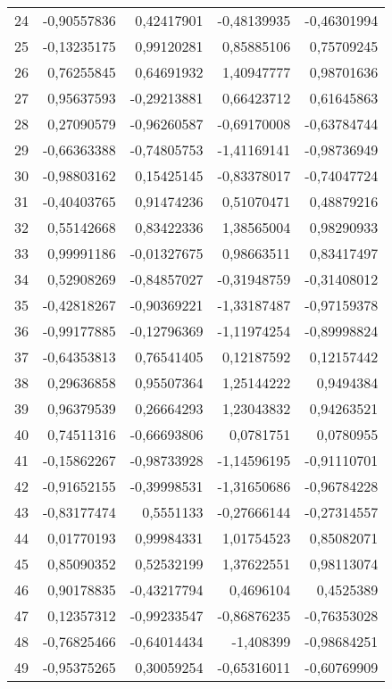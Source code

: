 \documentclass[12pt]{article}
\begin{document}
\begin{longtable}{lrrrr}
 24 & -0,90557836 & 0,42417901 & -0,48139935 & -0,46301994 \\
 25 & -0,13235175 & 0,99120281 & 0,85885106 & 0,75709245 \\
 26 & 0,76255845 & 0,64691932 & 1,40947777 & 0,98701636 \\
 27 & 0,95637593 & -0,29213881 & 0,66423712 & 0,61645863 \\
 28 & 0,27090579 & -0,96260587 & -0,69170008 & -0,63784744 \\
 29 & -0,66363388 & -0,74805753 & -1,41169141 & -0,98736949 \\
 30 & -0,98803162 & 0,15425145 & -0,83378017 & -0,74047724 \\
 31 & -0,40403765 & 0,91474236 & 0,51070471 & 0,48879216 \\
 32 & 0,55142668 & 0,83422336 & 1,38565004 & 0,98290933 \\
 33 & 0,99991186 & -0,01327675 & 0,98663511 & 0,83417497 \\
 34 & 0,52908269 & -0,84857027 & -0,31948759 & -0,31408012 \\
 35 & -0,42818267 & -0,90369221 & -1,33187487 & -0,97159378 \\
 36 & -0,99177885 & -0,12796369 & -1,11974254 & -0,89998824 \\
 37 & -0,64353813 & 0,76541405 & 0,12187592 & 0,12157442 \\
 38 & 0,29636858 & 0,95507364 & 1,25144222 &  0,9494384 \\
 39 & 0,96379539 & 0,26664293 & 1,23043832 & 0,94263521 \\
 40 & 0,74511316 & -0,66693806 &  0,0781751 &  0,0780955 \\
 41 & -0,15862267 & -0,98733928 & -1,14596195 & -0,91110701 \\
 42 & -0,91652155 & -0,39998531 & -1,31650686 & -0,96784228 \\
 43 & -0,83177474 &  0,5551133 & -0,27666144 & -0,27314557 \\
 44 & 0,01770193 & 0,99984331 & 1,01754523 & 0,85082071 \\
 45 & 0,85090352 & 0,52532199 & 1,37622551 & 0,98113074 \\
 46 & 0,90178835 & -0,43217794 &  0,4696104 &  0,4525389 \\
 47 & 0,12357312 & -0,99233547 & -0,86876235 & -0,76353028 \\
 48 & -0,76825466 & -0,64014434 &  -1,408399 & -0,98684251 \\
 49 & -0,95375265 & 0,30059254 & -0,65316011 & -0,60769909 \\

\end{longtable}
\end{document}
